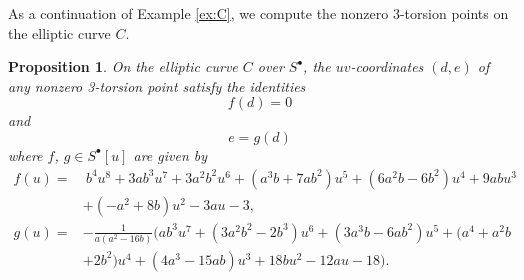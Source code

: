 \documentclass{gtpart}
\newtheorem{prop}[thm]{Proposition}
\theoremstyle{definition}
\theoremstyle{remark}
\newcommand{\s}{S^\bullet}
\numberwithin{equation}{section}
\numberwithin{thm}{section}
\begin{document}
As a continuation of Example \ref{ex:C}, we compute the nonzero 
3-torsion points on the elliptic curve $C$.  

\begin{prop}
\label{prop:tors}
 On the elliptic curve $C$ over $\s$, the $uv$-coordinates $(d,e)$ of 
 any nonzero 3-torsion point satisfy the identities 
 \begin{equation}
 \label{f}
  f(d) = 0 
 \end{equation}
 and 
 \begin{equation}
 \label{g}
  e = g(d) 
 \end{equation}
 where $f$, $g \in \s [u]$ are given by 
 \begin{equation*}
 \begin{split}
  f(u) = & ~ b^4 u^8 + 3 a b^3 u^7 + 3 a^2 b^2 u^6 + (a^3 b + 7 a b^2) u^5 + (6 a^2 b - 6 b^2) u^4 + 9 a b u^3 \\
         & + (-a^2 + 8 b) u^2 - 3 a u - 3, \\
  g(u) = & -\frac{1}{a (a^2 - 16 b)} \big( a b^3 u^7 + (3 a^2 b^2 - 2 b^3) u^6 + (3 a^3 b -6 a b^2) u^5 + (a^4 + a^2 b \\
         & + 2 b^2) u^4 + (4 a^3 - 15 a b) u^3 + 18 b u^2 - 12 a u - 18 \big).  
 \end{split}
 \end{equation*}
\end{prop}
\end{document}
